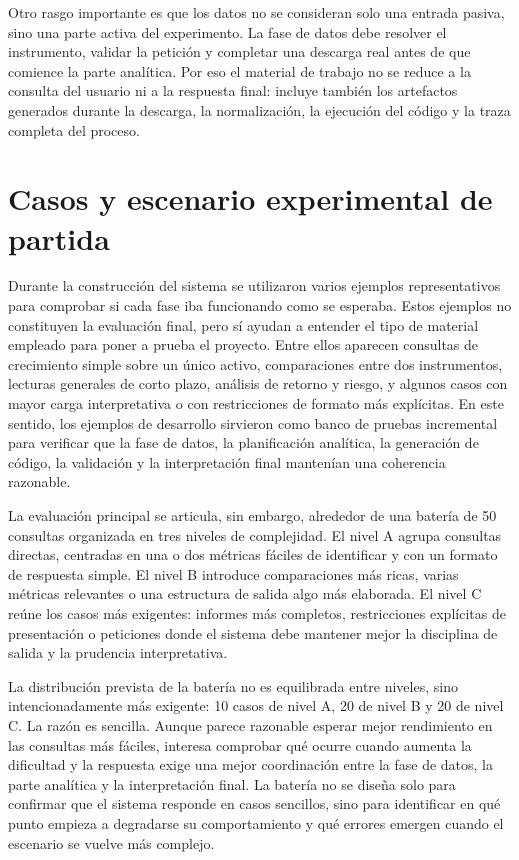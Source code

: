 Otro rasgo importante es que los datos no se consideran solo una entrada pasiva, sino una parte activa del experimento. La fase de datos debe resolver el instrumento, 
validar la petici\'on y completar una descarga real antes de que comience la parte anal\'itica. Por eso el material de trabajo no se reduce a la consulta del usuario ni 
a la respuesta final: incluye tambi\'en los artefactos generados durante la descarga, la normalizaci\'on, la ejecuci\'on del c\'odigo y la traza completa del proceso.

\section{Casos y escenario experimental de partida}

Durante la construcci\'on del sistema se utilizaron varios ejemplos representativos para comprobar si cada fase iba funcionando como se esperaba. Estos ejemplos no 
constituyen la evaluaci\'on final, pero s\'i ayudan a entender el tipo de material empleado para poner a prueba el proyecto. Entre ellos aparecen consultas de crecimiento 
simple sobre un \'unico activo, comparaciones entre dos instrumentos, lecturas generales de corto plazo, an\'alisis de retorno y riesgo, y algunos casos con mayor carga 
interpretativa o con restricciones de formato m\'as expl\'icitas. En este sentido, los ejemplos de desarrollo sirvieron como banco de pruebas incremental para verificar 
que la fase de datos, la planificaci\'on anal\'itica, la generaci\'on de c\'odigo, la validaci\'on y la interpretaci\'on final manten\'ian una coherencia razonable.

La evaluaci\'on principal se articula, sin embargo, alrededor de una bater\'ia de 50 consultas organizada en tres niveles de complejidad. El nivel A agrupa consultas 
directas, centradas en una o dos m\'etricas f\'aciles de identificar y con un formato de respuesta simple. El nivel B introduce comparaciones m\'as ricas, varias 
m\'etricas relevantes o una estructura de salida algo m\'as elaborada. El nivel C re\'une los casos m\'as exigentes: informes m\'as completos, restricciones expl\'icitas 
de presentaci\'on o peticiones donde el sistema debe mantener mejor la disciplina de salida y la prudencia interpretativa.

La distribuci\'on prevista de la bater\'ia no es equilibrada entre niveles, sino intencionadamente m\'as exigente: 10 casos de nivel A, 20 de nivel B y 20 de nivel C. La 
raz\'on es sencilla. Aunque parece razonable esperar mejor rendimiento en las consultas m\'as f\'aciles, interesa comprobar qu\'e ocurre cuando aumenta la dificultad y 
la respuesta exige una mejor coordinaci\'on entre la fase de datos, la parte anal\'itica y la interpretaci\'on final. La bater\'ia no se dise\~na solo para confirmar que 
el sistema responde en casos sencillos, sino para identificar en qu\'e punto empieza a degradarse su comportamiento y qu\'e errores emergen cuando el escenario se vuelve 
m\'as complejo.

